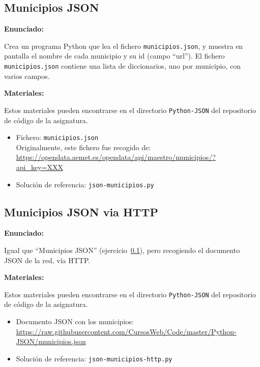 \subsection{Municipios JSON}
\label{subsec:json-municipios}

\textbf{Enunciado:}

Crea un programa Python que lea el fichero \verb|municipios.json|,
y muestra en pantalla el nombre de cada municipio y su id (campo ``url'').
El fichero \verb|municipios.json| contiene una lista de diccionarios,
uno por municipio, con varios campos.

\textbf{Materiales:}

Estos materiales pueden encontrarse en el
directorio \verb|Python-JSON| del repositorio de código de la
asignatura. 

\begin{itemize}
\item Fichero: \verb|municipios.json| \\
  Originalmente, este fichero fue recogido de: \\
  \url{https://opendata.aemet.es/opendata/api/maestro/municipios/?api_key=XXX}
\item Solución de referencia: \verb|json-municipios.py|
\end{itemize}

\subsection{Municipios JSON via HTTP}
\label{subsec:json-municipios-http}

\textbf{Enunciado:}

Igual que ``Municipios JSON'' (ejercicio~\ref{subsec:json-municipios}),
pero recogiendo el documento JSON de la red, vía HTTP.

\textbf{Materiales:}

Estos materiales pueden encontrarse en el
directorio \verb|Python-JSON| del repositorio de código de la
asignatura. 

\begin{itemize}
\item Documento JSON con los municipios: \\
  \url{https://raw.githubusercontent.com/CursosWeb/Code/master/Python-JSON/municipios.json}
\item Solución de referencia: \verb|json-municipios-http.py|
\end{itemize}

